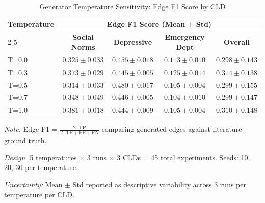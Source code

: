 \begin{table}[H]
\centering
\caption{Generator Temperature Sensitivity: Edge F1 Score by CLD}
\label{tab:temperature_sensitivity}
\begin{threeparttable}
\begin{tabular}{lcccc}
\toprule
\textbf{Temperature} & \multicolumn{4}{c}{\textbf{Edge F1 Score (Mean $\pm$ Std)}} \\
\cmidrule(lr){2-5}
 & \textbf{Social Norms} & \textbf{Depressive} & \textbf{Emergency Dept} & \textbf{Overall} \\
\midrule
T=0.0 & $0.325 \pm 0.033$ & $0.455 \pm 0.018$ & $0.113 \pm 0.010$ & $0.298 \pm 0.143$ \\
T=0.3 & $0.373 \pm 0.029$ & $0.445 \pm 0.005$ & $0.125 \pm 0.014$ & $0.314 \pm 0.138$ \\
T=0.5 & $0.314 \pm 0.033$ & $0.480 \pm 0.017$ & $0.105 \pm 0.004$ & $0.299 \pm 0.155$ \\
T=0.7 & $0.348 \pm 0.049$ & $0.446 \pm 0.005$ & $0.104 \pm 0.010$ & $0.299 \pm 0.147$ \\
T=1.0 & $0.381 \pm 0.018$ & $0.444 \pm 0.009$ & $0.105 \pm 0.004$ & $0.310 \pm 0.148$ \\
\bottomrule
\end{tabular}
\begin{tablenotes}
\small
\item \textit{Note.} Edge F1 = $\frac{2 \cdot \text{TP}}{2 \cdot \text{TP} + \text{FP} + \text{FN}}$ comparing generated edges against literature ground truth.
\item \textit{Design.} 5 temperatures $\times$ 3 runs $\times$ 3 CLDs = 45 total experiments. Seeds: 10, 20, 30 per temperature.
\item \textit{Uncertainty:} Mean $\pm$ Std reported as descriptive variability across 3 runs per temperature per CLD.
\end{tablenotes}
\end{threeparttable}
\end{table}